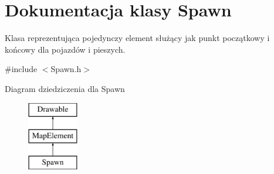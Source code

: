\hypertarget{class_spawn}{\section{Dokumentacja klasy Spawn}
\label{class_spawn}
}


Klasa reprezentująca pojedynczy element służący jak punkt początkowy i końcowy dla pojazdów i pieszych.  




{\ttfamily \#include $<$Spawn.\-h$>$}

Diagram dziedziczenia dla Spawn\begin{figure}[H]
\begin{center}
\leavevmode
\includegraphics[height=3.000000cm]{class_spawn}
\end{center}
\end{figure}
